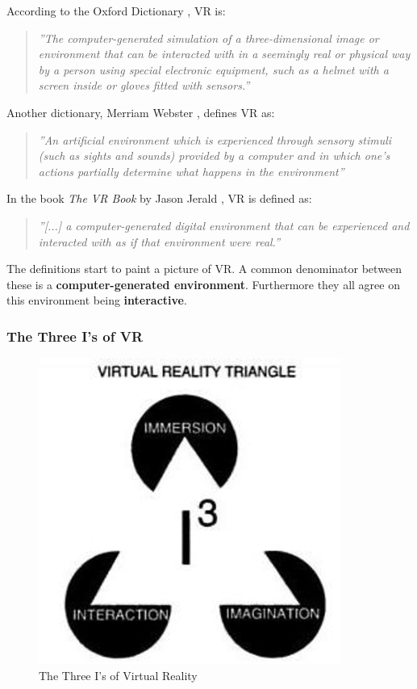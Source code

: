         According to the Oxford Dictionary \cite{oxford}, VR is:
        
        \begin{quote}
            \textit{''The computer-generated simulation of a three-dimensional image or environment that can be interacted with in a seemingly real or physical way by a person using special electronic equipment, such as a helmet with a screen inside or gloves fitted with sensors.''}
        \end{quote}
        
        Another dictionary, Merriam Webster \cite{merrian_webster}, defines VR as:
        
        \begin{quote}
            \textit{''An artificial environment which is experienced through sensory stimuli (such as sights and sounds) provided by a computer and in which one's actions partially determine what happens in the environment''}
        \end{quote}
        
        In the book \emph{The VR Book} by Jason Jerald \cite{the_vr_book}, VR is defined as:
        
        \begin{quote}
            \textit{''[...] a computer-generated digital environment that can be experienced and interacted with as if that environment were real.''}
        \end{quote}
        
        The definitions start to paint a picture of VR. A common denominator between these is a \textbf{computer-generated environment}. Furthermore they all agree on this environment being \textbf{interactive}.
        
            \subsubsection{The Three I's of VR}
                \label{sec:threei}
            
                \FloatBarrier
                \begin{figure}
                    \centering
                    \includegraphics[width=0.5\linewidth]{figures/three_i.png}
                    \caption{The Three I's of Virtual Reality}
                    \label{fig:three_i}
                \end{figure}
                \FloatBarrier
                
